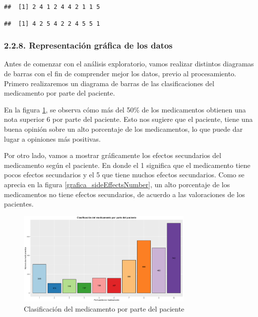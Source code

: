 \documentclass[spanish,]{article}
\newenvironment{Shaded}{\begin{snugshade}}{\end{snugshade}}
\newcommand{\KeywordTok}[1]{\textcolor[rgb]{0.13,0.29,0.53}{\textbf{#1}}}
\newcommand{\DecValTok}[1]{\textcolor[rgb]{0.00,0.00,0.81}{#1}}
\newcommand{\OperatorTok}[1]{\textcolor[rgb]{0.81,0.36,0.00}{\textbf{#1}}}
\newcommand{\NormalTok}[1]{#1}
\begin{document}
\begin{Shaded}
\end{Shaded}

\begin{verbatim}
##  [1] 2 4 1 2 4 4 2 1 1 5
\end{verbatim}

\begin{Shaded}
\end{Shaded}

\begin{verbatim}
##  [1] 4 2 5 4 2 2 4 5 5 1
\end{verbatim}

\subsubsection{2.2.8. Representación gráfica de los
datos}\label{representacion-grafica-de-los-datos}

Antes de comenzar con el análisis exploratorio, vamos realizar distintos
diagramas de barras con el fin de comprender mejor los datos, previo al
procesamiento. Primero realizaremos un diagrama de barras de las
clasificaciones del medicamento por parte del paciente.

En la figura \ref{grafica_rating}, se observa cómo más del 50\% de los
medicamentos obtienen una nota superior 6 por parte del paciente. Esto
nos sugiere que el paciente, tiene una buena opinión sobre un alto
porcentaje de los medicamentos, lo que puede dar lugar a opiniones más
positivas.

Por otro lado, vamos a mostrar gráficamente los efectos secundarios del
medicamento según el paciente. En donde el 1 significa que el
medicamento tiene pocos efectos secundarios y el 5 que tiene muchos
efectos secundarios. Como se aprecia en la figura
\ref{grafica_sideEffectsNumber}, un alto porcentaje de los medicamentos
no tiene efectos secundarios, de acuerdo a las valoraciones de los
pacientes.

\begin{figure}[ht]
    \centering
    \includegraphics[width=0.76\textwidth]{imagenes/grafica_rating.png}
    \caption{Clasificación del medicamento por parte del paciente}
    \label{grafica_rating}
\end{figure}
\end{document}
